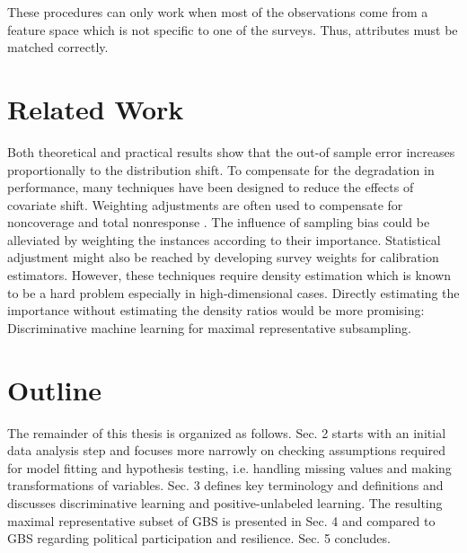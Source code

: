 These procedures can only work when most of the observations come from a feature space which is not specific to one of the surveys. Thus, attributes must be matched correctly. 

\section{Related Work}

Both theoretical and practical results show that the out-of sample error increases proportionally to the distribution shift. To compensate for the degradation in performance, many techniques have been designed to reduce the effects of covariate shift. Weighting adjustments are often used to compensate for noncoverage and total nonresponse \cite{brick}. The influence of sampling bias could be alleviated by weighting the instances according to their importance. Statistical adjustment might also be reached by developing survey weights for calibration estimators. However, these techniques require density estimation which is known to be a hard problem especially in high-dimensional cases. Directly estimating the importance without estimating the density ratios would be more promising: Discriminative machine learning for maximal representative subsampling.

\section{Outline}

The remainder of this thesis is organized as follows. Sec. 2 starts with an initial data analysis step and focuses more narrowly on checking assumptions required for model fitting and hypothesis testing, i.e. handling missing values and making transformations of variables. Sec. 3 defines key terminology and definitions and discusses discriminative learning and positive-unlabeled learning. The resulting maximal representative subset of GBS is presented in Sec. 4 and compared to GBS regarding political participation and resilience. Sec. 5 concludes.
